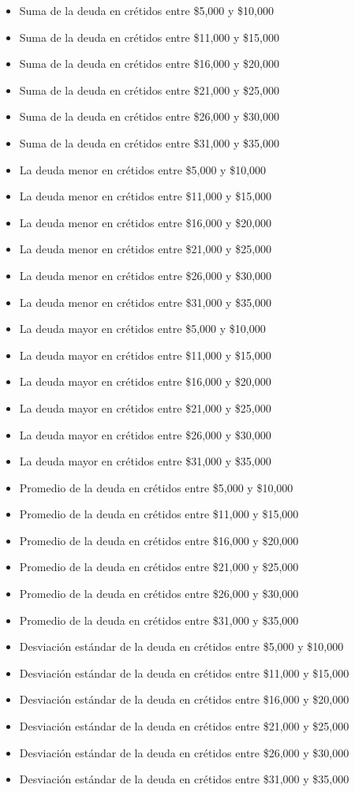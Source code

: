 \documentclass{article}
\begin{document}
\begin{itemize}
    \item Suma de la deuda en crétidos entre \$5,000 y \$10,000
    \item Suma de la deuda en crétidos entre \$11,000 y \$15,000
    \item Suma de la deuda en crétidos entre \$16,000 y \$20,000
    \item Suma de la deuda en crétidos entre \$21,000 y \$25,000
    \item Suma de la deuda en crétidos entre \$26,000 y \$30,000
    \item Suma de la deuda en crétidos entre \$31,000 y \$35,000
    \item La deuda menor en crétidos entre \$5,000 y \$10,000
    \item La deuda menor en crétidos entre \$11,000 y \$15,000
    \item La deuda menor en crétidos entre \$16,000 y \$20,000
    \item La deuda menor en crétidos entre \$21,000 y \$25,000
    \item La deuda menor en crétidos entre \$26,000 y \$30,000
    \item La deuda menor en crétidos entre \$31,000 y \$35,000
    \item La deuda mayor en crétidos entre \$5,000 y \$10,000
    \item La deuda mayor en crétidos entre \$11,000 y \$15,000
    \item La deuda mayor en crétidos entre \$16,000 y \$20,000
    \item La deuda mayor en crétidos entre \$21,000 y \$25,000
    \item La deuda mayor en crétidos entre \$26,000 y \$30,000
    \item La deuda mayor en crétidos entre \$31,000 y \$35,000
    \item Promedio de la deuda en crétidos entre \$5,000 y \$10,000
    \item Promedio de la deuda en crétidos entre \$11,000 y \$15,000
    \item Promedio de la deuda en crétidos entre \$16,000 y \$20,000
    \item Promedio de la deuda en crétidos entre \$21,000 y \$25,000
    \item Promedio de la deuda en crétidos entre \$26,000 y \$30,000
    \item Promedio de la deuda en crétidos entre \$31,000 y \$35,000
    \item Desviación estándar de la deuda en crétidos entre \$5,000 y \$10,000
    \item Desviación estándar de la deuda en crétidos entre \$11,000 y \$15,000
    \item Desviación estándar de la deuda en crétidos entre \$16,000 y \$20,000
    \item Desviación estándar de la deuda en crétidos entre \$21,000 y \$25,000
    \item Desviación estándar de la deuda en crétidos entre \$26,000 y \$30,000
    \item Desviación estándar de la deuda en crétidos entre \$31,000 y \$35,000
\end{itemize}
\end{document}
